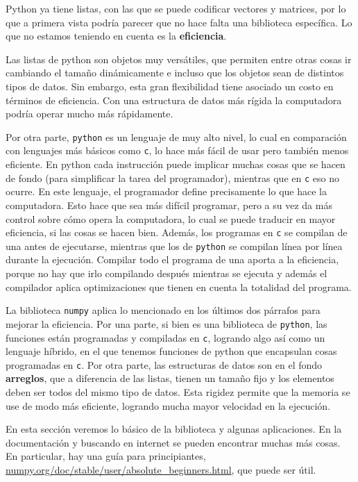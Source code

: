 \documentclass[a4paper, 12pt]{report}
\theoremstyle{definition}
\begin{document}
Python ya tiene listas, con las que se puede codificar vectores y matrices, por lo que a primera vista podría parecer que no hace falta una biblioteca específica. Lo que no estamos teniendo en cuenta es la {\bf eficiencia}.

Las listas de python son objetos muy versátiles, que permiten entre otras cosas ir cambiando el tamaño dinámicamente e incluso que los objetos sean de distintos tipos de datos. Sin embargo, esta gran flexibilidad tiene asociado un costo en términos de eficiencia. Con una estructura de datos más rígida la computadora podría operar mucho más rápidamente.

Por otra parte, {\tt python} es un lenguaje de muy alto nivel, lo cual en comparación con lenguajes más básicos como {\tt c}, lo hace más fácil de usar pero también menos eficiente. En python cada instrucción puede implicar muchas cosas que se hacen de fondo (para simplificar la tarea del programador), mientras que en {\tt c} eso no ocurre. En este lenguaje, el programador define precisamente lo que hace la computadora. Esto hace que sea más difícil programar, pero a su vez da más control sobre cómo opera la computadora, lo cual se puede traducir en mayor eficiencia, si las cosas se hacen bien. Además, los programas en {\tt c} se compilan de una antes de ejecutarse, mientras que los de {\tt python} se compilan línea por línea durante la ejecución. Compilar todo el programa de una aporta a la eficiencia, porque no hay que irlo compilando después mientras se ejecuta y además el compilador aplica optimizaciones que tienen en cuenta la totalidad del programa.

La biblioteca {\tt numpy} aplica lo mencionado en los últimos dos párrafos para mejorar la eficiencia. Por una parte, si bien es una biblioteca de {\tt python}, las funciones están programadas y compiladas en {\tt c}, logrando algo así como un lenguaje híbrido, en el que tenemos funciones de python que encapsulan cosas programadas en {\tt c}. Por otra parte, las estructuras de datos son en el fondo {\bf arreglos}, que a diferencia de las listas, tienen un tamaño fijo y los elementos deben ser todos del mismo tipo de datos. Esta rigidez permite que la memoria se use de modo más eficiente, logrando mucha mayor velocidad en la ejecución.

En esta sección veremos lo básico de la biblioteca y algunas aplicaciones. En la documentación y buscando en internet se pueden encontrar muchas más cosas. En particular, hay una guía para principiantes, \href{https://numpy.org/doc/stable/user/absolute_beginners.html}{numpy.org/doc/stable/user/absolute\_beginners.html}, que puede ser útil.
\end{document}
